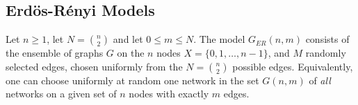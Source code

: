 \documentclass[a4paper,11pt]{article}
\begin{document}
\subsection{Erd\"os-Rényi Models}
Let $n \geq 1$, let $N = \binom{n}{2}$ and let $0 \leq m \leq N$.
The model $G_{ER}(n,m)$ consists of the ensemble of graphs $G$ on the $n$ nodes $X = \{0,1, \dots, n-1\}$, and $M$ randomly selected edges, chosen uniformly from the $N = \binom{n}{2}$  possible edges.
Equivalently, one can choose uniformly at random one network in the set $G(n,m)$ of \textit{all} networks on a given set of $n$ nodes with exactly $m$ edges.
\end{document}
